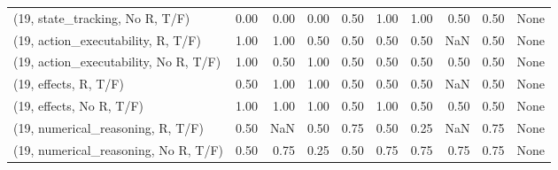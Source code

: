 \begin{table*}[h!]
\begin{adjustbox}{width=2\columnwidth,center}
\begin{tabular}{lrrr|rrr|rrr}
(19, state\_tracking, No R, T/F)       &                      0.00 &                  0.00 &                      0.00 &                          0.50 &                      1.00 &                          1.00 &                                   0.50 &                               0.50 &                                  None \\
(19, action\_executability, R, T/F)    &                      1.00 &                  1.00 &                      0.50 &                          0.50 &                      0.50 &                          0.50 &                                    NaN &                               0.50 &                                  None \\
(19, action\_executability, No R, T/F) &                      1.00 &                  0.50 &                      1.00 &                          0.50 &                      0.50 &                          0.50 &                                   0.50 &                               0.50 &                                  None \\
(19, effects, R, T/F)                 &                      0.50 &                  1.00 &                      1.00 &                          0.50 &                      0.50 &                          0.50 &                                    NaN &                               0.50 &                                  None \\
(19, effects, No R, T/F)              &                      1.00 &                  1.00 &                      1.00 &                          0.50 &                      1.00 &                          0.50 &                                   0.50 &                               0.50 &                                  None \\
(19, numerical\_reasoning, R, T/F)     &                      0.50 &                   NaN &                      0.50 &                          0.75 &                      0.50 &                          0.25 &                                    NaN &                               0.75 &                                  None \\
(19, numerical\_reasoning, No R, T/F)  &                      0.50 &                  0.75 &                      0.25 &                          0.50 &                      0.75 &                          0.75 &                                   0.75 &                               0.75 &                                  None \\

\end{tabular}
\end{adjustbox}
\end{table*}
